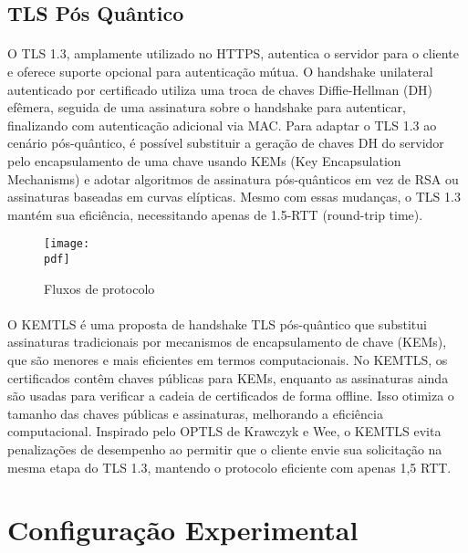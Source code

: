 \documentclass[letterpaper,11pt,leqno]{article}
\newcommand{\pdf}{figures/figures}
\begin{document}
\subsection{TLS Pós Quântico}

\paragraph{}
O TLS 1.3, amplamente utilizado no HTTPS, autentica o servidor para o cliente e
oferece suporte opcional para autenticação mútua. O handshake unilateral
autenticado por certificado utiliza uma troca de chaves Diffie-Hellman (DH)
efêmera, seguida de uma assinatura sobre o handshake para autenticar,
finalizando com autenticação adicional via MAC. Para adaptar o TLS 1.3 ao
cenário pós-quântico, é possível substituir a geração de chaves DH do servidor
pelo encapsulamento de uma chave usando KEMs (Key Encapsulation Mechanisms) e
adotar algoritmos de assinatura pós-quânticos em vez de RSA ou assinaturas
baseadas em curvas elípticas. Mesmo com essas mudanças, o TLS 1.3 mantém sua
eficiência, necessitando apenas de 1.5-RTT (round-trip time).

\begin{figure}[H]
	{\texttt{[image: \\pdf]}}
	\caption{Fluxos de protocolo}
	\label{f:figure1}\end{figure}

\paragraph{}
O KEMTLS é uma proposta de handshake TLS pós-quântico que substitui assinaturas
tradicionais por mecanismos de encapsulamento de chave (KEMs), que são menores e
mais eficientes em termos computacionais. No KEMTLS, os certificados contêm
chaves públicas para KEMs, enquanto as assinaturas ainda são usadas para
verificar a cadeia de certificados de forma offline. Isso otimiza o tamanho das
chaves públicas e assinaturas, melhorando a eficiência computacional. Inspirado
pelo OPTLS de Krawczyk e Wee, o KEMTLS evita penalizações de desempenho ao
permitir que o cliente envie sua solicitação na mesma etapa do TLS 1.3, mantendo
o protocolo eficiente com apenas 1,5 RTT.

\section{Configuração Experimental}
\end{document}
